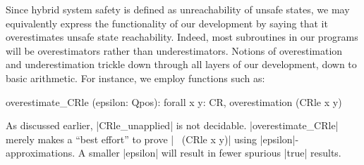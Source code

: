 \documentclass[runningheads]{llncs}
\begin{document}
Since hybrid system safety is defined as unreachability of unsafe
states, we may equivalently express the functionality of our
development by saying that it overestimates unsafe state
reachability. Indeed, most subroutines in our programs will be
overestimators rather than underestimators. Notions of overestimation
and underestimation trickle down through all layers of our
development, down to basic arithmetic. For instance, we employ
functions such as:



\begin{code}
overestimate_CRle (epsilon: Qpos): forall x y: CR, overestimation (CRle x y)
\end{code}
As discussed earlier, |CRle_unapplied| is not
decidable. |overestimate_CRle| merely makes a ``best effort'' to prove
|~ (CRle x y)| using |epsilon|-approximations. A smaller |epsilon|
will result in fewer spurious |true| results.


\end{document}
